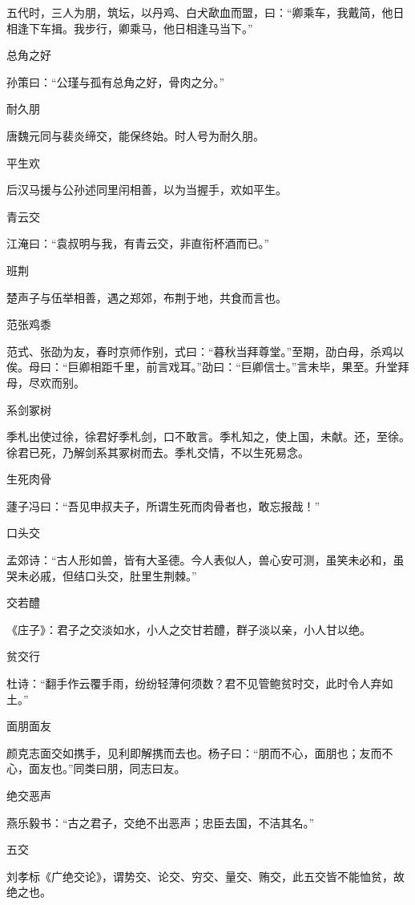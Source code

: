 \documentclass[a4paper,12pt,UTF8,twoside]{ctexbook}
\begin{document}
    五代时，三人为朋，筑坛，以丹鸡、白犬歃血而盟，曰：“卿乘车，我戴简，他日相逢下车揖。我步行，卿乘马，他日相逢马当下。”
    
    总角之好
    
    孙策曰：“公瑾与孤有总角之好，骨肉之分。”
    
    耐久朋
    
    唐魏元同与裴炎缔交，能保终始。时人号为耐久朋。
    
    平生欢
    
    后汉马援与公孙述同里闬相善，以为当握手，欢如平生。
    
    青云交
    
    江淹曰：“袁叔明与我，有青云交，非直衔杯酒而已。”
    
    班荆
    
    楚声子与伍举相善，遇之郑郊，布荆于地，共食而言也。
    
    范张鸡黍
    
    范式、张劭为友，春时京师作别，式曰：“暮秋当拜尊堂。”至期，劭白母，杀鸡以俟。母曰：“巨卿相距千里，前言戏耳。”劭曰：“巨卿信士。”言未毕，果至。升堂拜母，尽欢而别。
    
    系剑冢树
    
    季札出使过徐，徐君好季札剑，口不敢言。季札知之，使上国，未献。还，至徐。徐君已死，乃解剑系其冢树而去。季札交情，不以生死易念。
    
    生死肉骨
    
    蘧子冯曰：“吾见申叔夫子，所谓生死而肉骨者也，敢忘报哉！”
    
    口头交
    
    孟郊诗：“古人形如兽，皆有大圣德。今人表似人，兽心安可测，虽笑未必和，虽哭未必戚，但结口头交，肚里生荆棘。”
    
    交若醴
    
    《庄子》：君子之交淡如水，小人之交甘若醴，群子淡以亲，小人甘以绝。
    
    贫交行
    
    杜诗：“翻手作云覆手雨，纷纷轻薄何须数？君不见管鲍贫时交，此时令人弃如土。”
    
    面朋面友
    
    颜克志面交如携手，见利即解携而去也。杨子曰：“朋而不心，面朋也；友而不心，面友也。”同类曰朋，同志曰友。
    
    绝交恶声
    
    燕乐毅书：“古之君子，交绝不出恶声；忠臣去国，不洁其名。”
    
    五交
    
    刘孝标《广绝交论》，谓势交、论交、穷交、量交、贿交，此五交皆不能恤贫，故绝之也。
    
\end{document}
